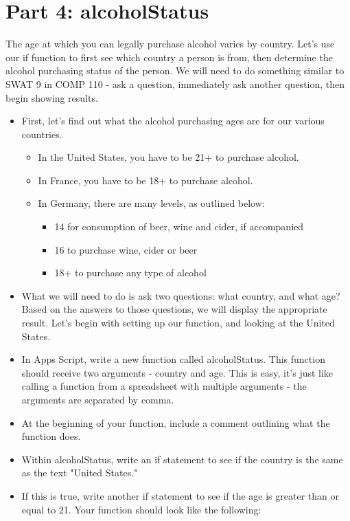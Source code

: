 \documentclass{article}
\begin{document}
\section*{Part 4:  alcoholStatus}
The age at which you can legally purchase alcohol varies by country.  Let's use our if function to first see which country a person is from, then determine the alcohol purchasing status of the person.  We will need to do something similar to SWAT 9 in COMP 110 - ask a question, immediately ask another question, then begin showing results.  
\begin{itemize}
    \item First, let's find out what the alcohol purchasing ages are for our various countries.
    \begin{itemize}
    		\item In the United States, you have to be 21+ to purchase alcohol.
    		\item In France, you have to be 18+ to purchase alcohol.
    		\item In Germany, there are many levels, as outlined below:
    		\begin{itemize}
    			\item 14 for consumption of beer, wine and cider, if accompanied
    			\item 16 to purchase wine, cider or beer
    			\item 18+ to purchase any type of alcohol
    		\end{itemize}
    	\end{itemize}
    	\item What we will need to do is ask two questions:  what country, and what age?  Based on the answers to those questions, we will display the appropriate result.  Let's begin with setting up our function, and looking at the United States.
    	\item In Apps Script, write a new function called alcoholStatus.  This function should receive two arguments - country and age.  This is easy, it's just like calling a function from a spreadsheet with multiple arguments - the arguments are separated by comma.
    	\item At the beginning of your function, include a comment outlining what the function does.
    	\item Within alcoholStatus, write an if statement to see if the country is the same as the text "United States."
    	\item If this is true, write another if statement to see if the age is greater than or equal to 21.  Your function should look like the following:

\end{itemize}
\end{document}

